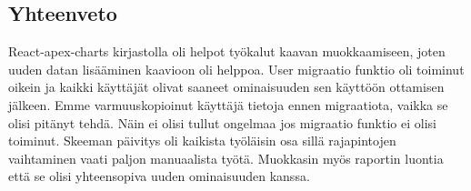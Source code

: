 \subsection*{Yhteenveto}

React-apex-charts kirjastolla oli helpot työkalut kaavan muokkaamiseen, joten uuden datan lisääminen kaavioon oli helppoa.
User migraatio funktio oli toiminut oikein ja kaikki käyttäjät olivat saaneet ominaisuuden sen käyttöön ottamisen jälkeen.
Emme varmuuskopioinut käyttäjä tietoja ennen migraatiota, vaikka se olisi pitänyt tehdä. Näin ei olisi tullut ongelmaa jos migraatio funktio ei olisi toiminut.
Skeeman päivitys oli kaikista työläisin osa sillä rajapintojen vaihtaminen vaati paljon manuaalista työtä.
Muokkasin myös raportin luontia että se olisi yhteensopiva uuden ominaisuuden kanssa.





